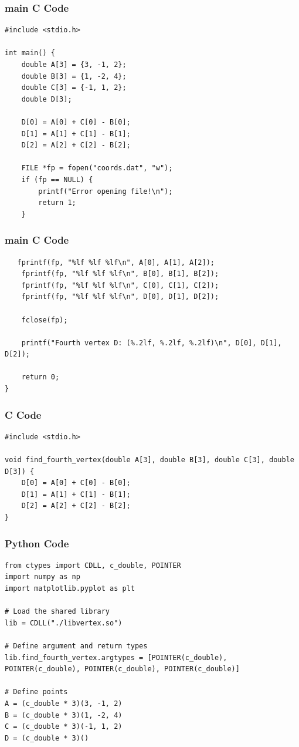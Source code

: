 \documentclass{beamer}
\begin{document}
\begin{frame}[fragile]
    \frametitle{main C Code}

    \begin{lstlisting}
#include <stdio.h>

int main() {
    double A[3] = {3, -1, 2};
    double B[3] = {1, -2, 4};
    double C[3] = {-1, 1, 2};
    double D[3];

    D[0] = A[0] + C[0] - B[0];
    D[1] = A[1] + C[1] - B[1];
    D[2] = A[2] + C[2] - B[2];

    FILE *fp = fopen("coords.dat", "w");
    if (fp == NULL) {
        printf("Error opening file!\n");
        return 1;
    }
    \end{lstlisting}
\end{frame}

\begin{frame}[fragile]
    \frametitle{main C Code}

    \begin{lstlisting}
   fprintf(fp, "%lf %lf %lf\n", A[0], A[1], A[2]);
    fprintf(fp, "%lf %lf %lf\n", B[0], B[1], B[2]);
    fprintf(fp, "%lf %lf %lf\n", C[0], C[1], C[2]);
    fprintf(fp, "%lf %lf %lf\n", D[0], D[1], D[2]);

    fclose(fp);

    printf("Fourth vertex D: (%.2lf, %.2lf, %.2lf)\n", D[0], D[1], D[2]);

    return 0;
}
    \end{lstlisting}
\end{frame}

\begin{frame}[fragile]
    \frametitle{C Code}

    \begin{lstlisting}
#include <stdio.h>

void find_fourth_vertex(double A[3], double B[3], double C[3], double D[3]) {
    D[0] = A[0] + C[0] - B[0];
    D[1] = A[1] + C[1] - B[1];
    D[2] = A[2] + C[2] - B[2];
}
    \end{lstlisting}
\end{frame}
\begin{frame}[fragile]
    \frametitle{Python Code}
    \begin{lstlisting}
from ctypes import CDLL, c_double, POINTER
import numpy as np
import matplotlib.pyplot as plt

# Load the shared library
lib = CDLL("./libvertex.so")

# Define argument and return types
lib.find_fourth_vertex.argtypes = [POINTER(c_double), POINTER(c_double), POINTER(c_double), POINTER(c_double)]

# Define points
A = (c_double * 3)(3, -1, 2)
B = (c_double * 3)(1, -2, 4)
C = (c_double * 3)(-1, 1, 2)
D = (c_double * 3)()
    \end{lstlisting}
\end{frame}
\end{document}
